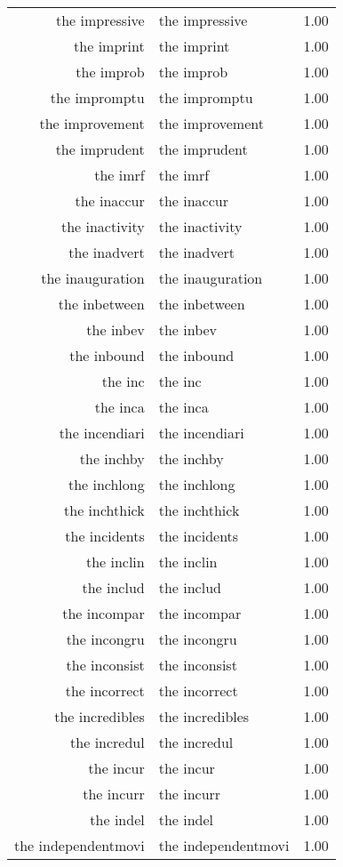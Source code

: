 \begin{table}[ht]
\begin{tabular}{rlr}
  the impressive & the impressive & 1.00 \\ 
  the imprint & the imprint & 1.00 \\ 
  the improb & the improb & 1.00 \\ 
  the impromptu & the impromptu & 1.00 \\ 
  the improvement & the improvement & 1.00 \\ 
  the imprudent & the imprudent & 1.00 \\ 
  the imrf & the imrf & 1.00 \\ 
  the inaccur & the inaccur & 1.00 \\ 
  the inactivity & the inactivity & 1.00 \\ 
  the inadvert & the inadvert & 1.00 \\ 
  the inauguration & the inauguration & 1.00 \\ 
  the inbetween & the inbetween & 1.00 \\ 
  the inbev & the inbev & 1.00 \\ 
  the inbound & the inbound & 1.00 \\ 
  the inc & the inc & 1.00 \\ 
  the inca & the inca & 1.00 \\ 
  the incendiari & the incendiari & 1.00 \\ 
  the inchby & the inchby & 1.00 \\ 
  the inchlong & the inchlong & 1.00 \\ 
  the inchthick & the inchthick & 1.00 \\ 
  the incidents & the incidents & 1.00 \\ 
  the inclin & the inclin & 1.00 \\ 
  the includ & the includ & 1.00 \\ 
  the incompar & the incompar & 1.00 \\ 
  the incongru & the incongru & 1.00 \\ 
  the inconsist & the inconsist & 1.00 \\ 
  the incorrect & the incorrect & 1.00 \\ 
  the incredibles & the incredibles & 1.00 \\ 
  the incredul & the incredul & 1.00 \\ 
  the incur & the incur & 1.00 \\ 
  the incurr & the incurr & 1.00 \\ 
  the indel & the indel & 1.00 \\ 
  the independentmovi & the independentmovi & 1.00 \\ 

\end{tabular}
\end{table}
